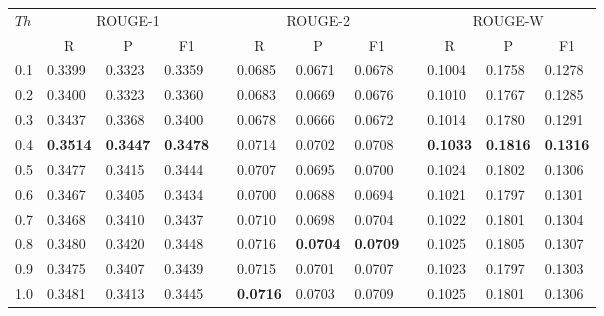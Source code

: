  \setlength{\tabcolsep}{5pt}
\begin{tabular*}{\textwidth}{@{\extracolsep{\fill}}llllllllllll} 
\hline \hline
\multirow{2}{*}{$ Th $}	& \multicolumn{3}{c}{ROUGE-1}	&& \multicolumn{3}{c}{ROUGE-2}	&& \multicolumn{3}{c}{ROUGE-W} \\
\cline{2-4} \cline{6-8} \cline{10-12}
	& \multicolumn{1}{c}{R}		& \multicolumn{1}{c}{P}	& \multicolumn{1}{c}{F1}	&& \multicolumn{1}{c}{R}	& \multicolumn{1}{c}{P}	& \multicolumn{1}{c}{F1}	&& \multicolumn{1}{c}{R}	& \multicolumn{1}{c}{P}	& \multicolumn{1}{c}{F1} \\
\hline
0.1	& 0.3399	& 0.3323	& 0.3359	&& 0.0685	& 0.0671	& 0.0678	&& 0.1004	& 0.1758	& 0.1278 \\
0.2	& 0.3400	& 0.3323	& 0.3360	&& 0.0683	& 0.0669	& 0.0676	&& 0.1010	& 0.1767	& 0.1285 \\
0.3	& 0.3437	& 0.3368	& 0.3400	&& 0.0678	& 0.0666	& 0.0672	&& 0.1014	& 0.1780	& 0.1291 \\
0.4	& \textbf{0.3514}	& \textbf{0.3447}	& \textbf{0.3478}	&& 0.0714	& 0.0702	& 0.0708	&& \textbf{0.1033}	& \textbf{0.1816}	& \textbf{0.1316} \\
0.5	& 0.3477	& 0.3415	& 0.3444	&& 0.0707	& 0.0695	& 0.0700	&& 0.1024	& 0.1802	& 0.1306 \\
0.6	& 0.3467	& 0.3405	& 0.3434	&& 0.0700	& 0.0688	& 0.0694	&& 0.1021	& 0.1797	& 0.1301 \\
0.7	& 0.3468	& 0.3410	& 0.3437	&& 0.0710	& 0.0698	& 0.0704	&& 0.1022	& 0.1801	& 0.1304 \\
0.8	& 0.3480	& 0.3420	& 0.3448	&& 0.0716	& \textbf{0.0704}	& \textbf{0.0709}	&& 0.1025	& 0.1805	& 0.1307 \\
0.9	& 0.3475	& 0.3407	& 0.3439	&& 0.0715	& 0.0701	& 0.0707	&& 0.1023	& 0.1797	& 0.1303 \\
1.0	& 0.3481	& 0.3413	& 0.3445	&& \textbf{0.0716}	& 0.0703	& 0.0709	&& 0.1025	& 0.1801	& 0.1306 \\
\hline \hline
\end{tabular*}
